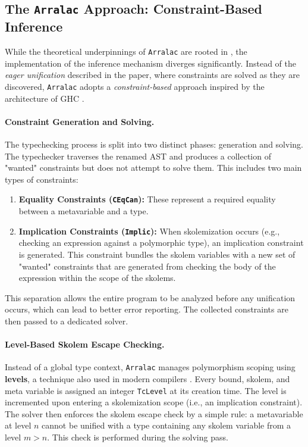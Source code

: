 \subsection{The \texttt{Arralac} Approach: Constraint-Based Inference}
\label{sec:Design:ArralacApproach}

While the theoretical underpinnings of \texttt{Arralac} are rooted in \cite{jones-practical-2007}, the implementation of the inference mechanism diverges significantly. Instead of the \textit{eager unification} described in the paper, where constraints are solved as they are discovered, \texttt{Arralac} adopts a \textit{constraint-based} approach inspired by the architecture of GHC \cite{ghc-aosabook-2025, wits-type-inference-using-constraints}.

\paragraph{Constraint Generation and Solving.} The typechecking process is split into two distinct phases: generation and solving. The typechecker traverses the renamed AST and produces a collection of "wanted" constraints but does not attempt to solve them. This includes two main types of constraints:
\begin{enumerate}
    \item \textbf{Equality Constraints (\texttt{CEqCan}):} These represent a required equality between a metavariable and a type.
    \item \textbf{Implication Constraints (\texttt{Implic}):} When skolemization occurs (e.g., checking an expression against a polymorphic type), an implication constraint is generated. This constraint bundles the skolem variables with a new set of "wanted" constraints that are generated from checking the body of the expression within the scope of the skolems.
\end{enumerate}

This separation allows the entire program to be analyzed before any unification occurs, which can lead to better error reporting. The collected constraints are then passed to a dedicated solver.

\paragraph{Level-Based Skolem Escape Checking.} Instead of a global type context, \texttt{Arralac} manages polymorphism scoping using \textbf{levels}, a technique also used in modern compilers \cite{practical-type-inference-with-levels-2025}. Every bound, skolem, and meta variable is assigned an integer \texttt{TcLevel} at its creation time. The level is incremented upon entering a skolemization scope (i.e., an implication constraint). The solver then enforces the skolem escape check by a simple rule: a metavariable at level $n$ cannot be unified with a type containing any skolem variable from a level $m > n$. This check is performed during the solving pass.

